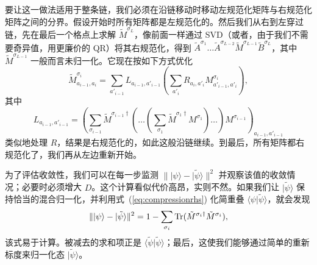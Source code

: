 \documentclass[a4paper,10pt,oneside,onecolumn,1p,times]{elsarticle}
\newcommand{\tr}{{\rm Tr }}
\newcommand{\ket}[1]{\mbox{$| #1  \rangle$}}
\newcommand{\braket}[2]{\mbox{$\langle #1  | #2 \rangle$}} 	%
\begin{document}
要让这一做法适用于整条链，我们必须在沿链移动时移动左规范化矩阵与右规范化矩阵之间的分界。假设开始时所有矩阵都是左规范化的。然后我们从右到左穿过链，先在最后一个格点上求解 $\tilde{M}^{\sigma_L}$，像前面一样通过 SVD（或者，由于我们不需要奇异值，用更廉价的 QR）将其右规范化，得到 $\tilde{A}^{\sigma_1} \ldots \tilde{A}^{\sigma_{L-2}} \tilde{M}^{\sigma_{L-1}} \tilde{B}^{\sigma_{L}}$，其中 $\tilde{M}^{\sigma_{L-1}}$ 一般而言未归一化。它现在按如下方式优化
\begin{equation}
\tilde{M}^{\sigma_i}_{a_{i-1},a_i} =  \sum_{a'_{i-1}} L_{a_{i-1},a'_{i-1}} \left( \sum_{a'_i} R_{a_{i},a'_{i}}
M^{\sigma_i}_{a'_{i-1},a'_i} \right), 
\label{eq:compressionrhs}
\end{equation}
其中 
\begin{equation}
L_{a_{i-1},a'_{i-1}} = \left( \sum_{\sigma_{i-1}}  \tilde{M}^{\sigma_{i-1}\dagger} \left( \ldots \left( \sum_{\sigma_1}  
\tilde{M}^{\sigma_{1}\dagger} M^{\sigma_{1}} \right) \ldots \right) M^{\sigma_{i-1}} \right)_{a_{i-1},a'_{i-1}}
\end{equation}
类似地处理 $R$，结果是右规范化的，如此这般沿链继续。到最后，所有矩阵都右规范化了，我们再从左边重新开始。

为了评估收敛性，我们可以在每一步监测 $\| \ket{\psi} - \ket{\tilde{\psi}} \|^2$ 并观察该值的收敛情况；必要时必须增大 $D$。这个计算看似代价高昂，实则不然。如果我们让 $\ket{\tilde{\psi}}$ 保持恰当的混合归一化，并利用式~(\ref{eq:compressionrhs}) 化简重叠 $\braket{\psi}{\tilde{\psi}}$，就会发现
\begin{equation}
\| \ket{\psi} - \ket{\tilde{\psi}} \|^2 = 1 - \sum_{\sigma_i} \tr (\tilde{M}^{\sigma_i\dagger}\tilde{M}^{\sigma_i}) , 
\end{equation}
该式易于计算。被减去的求和项正是 $\braket{\tilde{\psi}}{\tilde{\psi}}$；最后，这使我们能够通过简单的重新标度来归一化态 $\ket{\tilde{\psi}}$。
\end{document}
